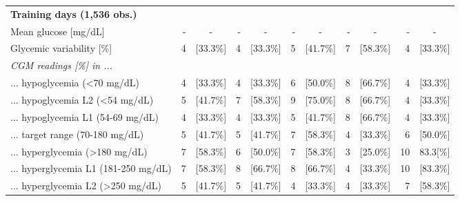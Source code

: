 \documentclass[11pt,a4paper]{article}
\begin{document}
\begin{threeparttable}
\begin{tabular}{@{}l rc rc rc rc rc@{}}
        \textbf{Training days (1,536 obs.)}\\
        Mean glucose [mg/dL] & - & - & - & - & - & - & - & - & - & -\\
        Glycemic variability [\%]                         & 4 & [33.3\%] & 4 & [33.3\%] & 5 & [41.7\%] & 7 & [58.3\%] & 4 & [33.3\%]\\
        \textit{CGM readings [\%] in ...} \\
        ... hypoglycemia (<70 mg/dL)                      & 4 & [33.3\%] & 4 & [33.3\%] & 6 & [50.0\%] & 8 & [66.7\%] & 4 & [33.3\%]\\
        \hspace{3mm} ... hypoglycemia L2 (<54 mg/dL)      & 5 & [41.7\%] & 7 & [58.3\%] & 9 & [75.0\%] & 8 & [66.7\%] & 4 & [33.3\%]\\
        \hspace{3mm} ... hypoglycemia L1 (54-69 mg/dL)    & 4 & [33.3\%] & 4 & [33.3\%] & 5 & [41.7\%] & 8 & [66.7\%] & 4 & [33.3\%]\\
        ... target range (70-180 mg/dL)                   & 5 & [41.7\%] & 5 & [41.7\%] & 7 & [58.3\%] & 4 & [33.3\%] & 6 & [50.0\%]\\
        ... hyperglycemia (>180 mg/dL)                    & 7 & [58.3\%] & 6 & [50.0\%] & 7 & [58.3\%] & 3 & [25.0\%] & 10 & 83.3[\%]\\
        \hspace{3mm} ... hyperglycemia L1 (181-250 mg/dL) & 7 & [58.3\%] & 8 & [66.7\%] & 8 & [66.7\%] & 4 & [33.3\%] & 10 & [83.3\%]\\
        \hspace{3mm} ... hyperglycemia L2 (>250 mg/dL)    & 5 & [41.7\%] & 5 & [41.7\%] & 4 & [33.3\%] & 4 & [33.3\%] & 7 & [58.3\%]\\    \midrule
    

\end{tabular}
\end{threeparttable}
\end{document}
